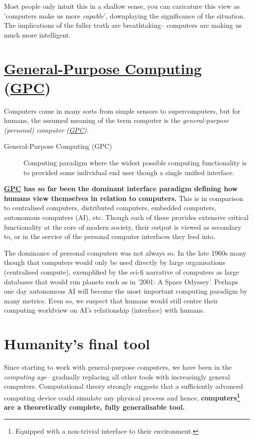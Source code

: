 \documentclass[logo,bsc,singlespacing,parskip]{infthesis}
\begin{document}
Most people only intuit this in a shallow sense, you can caricature this view as 'computers make us more \emph{capable}', downplaying the significance of the situation.
The implications of the fuller truth are breathtaking-- computers are making us much more intelligent.

\section{\hyperref[org2840555]{General-Purpose Computing} (\hyperref[orge31a644]{GPC})}
\label{sec:org3e14001}
Computers come in many sorts from simple sensors to supercomputers, but for humans, the assumed meaning of the term computer is the \emph{general-purpose (personal) computer (\hyperref[orge31a644]{GPC})}.

\begin{mdframed}
\begin{description}
\item[{\label{org2840555}General-Purpose Computing (\label{orge31a644}GPC)}] Computing paradigm where the widest possible computing functionality is to provided some individual end user though a single unified interface.
\end{description}
\end{mdframed}

\textbf{\hyperref[orge31a644]{GPC} has so far been the dominant interface paradigm defining how humans view themselves in relation to computers.}
This is in comparison to centralised computers, distributed computers, embedded computers, autonomous computers (AI), etc.
Though each of these provides extensive critical functionality at the core of modern society, their output is viewed as secondary to, or in the service of the personal computer interfaces they feed into.

The dominance of personal computers was not always so.
In the late 1960s many though that computers would only be used directly by large organisations (centralised compute), exemplified by the sci-fi narrative of computers as large databases that would run planets such as in '2001: A Space Odyssey'.
Perhaps one day autonomous AI will become the most important computing paradigm by many metrics.
Even so, we suspect that humans would still centre their computing worldview on AI's relationship (interface) with humans.

\section{Humanity's final tool}
\label{sec:org890432b}
Since starting to work with general-purpose computers, we have been in the \emph{computing age}-- gradually replacing all other tools with increasingly general computers.
Computational theory strongly suggests that a sufficiently advanced computing device could simulate any physical process and hence, \textbf{computers\footnote{Equipped with a non-trivial interface to their environment.} are a theoretically complete, fully generalisable tool.}
\end{document}
